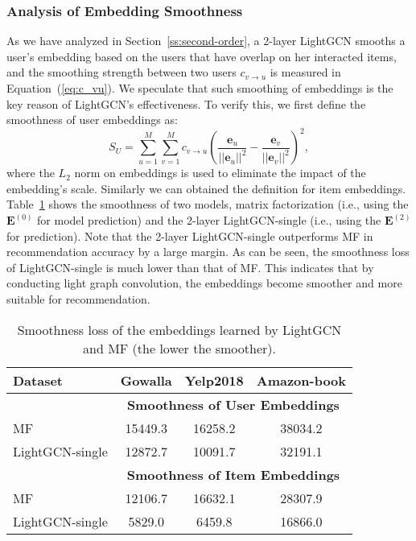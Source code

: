 \documentclass[sigconf]{acmart}
\theoremstyle{definition}
\begin{document}
\subsubsection{Analysis of Embedding Smoothness} 
As we have analyzed in Section~\ref{ss:second-order}, a 2-layer LightGCN smooths a user's embedding based on the users that have overlap on her interacted items, and the smoothing strength between two users $c_{v\to u}$ is measured in Equation~(\ref{eq:c_vu}). We speculate that such smoothing of embeddings is the key reason of LightGCN's effectiveness. To verify this, we first define the smoothness of user embeddings as:
\begin{equation}
    S_U = \sum_{u=1}^M \sum_{v=1}^M c_{v\to u} (\frac{\textbf{e}_{u}}{||\textbf{e}_{u}||^2} - \frac{\textbf{e}_{v}}{||\textbf{e}_{v}||^2})^2, 
\end{equation}
where the $L_2$ norm on embeddings is used to eliminate the impact of the embedding's scale. Similarly we can obtained the definition for item embeddings. 
Table~\ref{tab:Smoothness} shows the smoothness of two models, matrix factorization (i.e., using the $\textbf{E}^{(0)}$ for model prediction) and the 2-layer LightGCN-single (i.e., using the $\textbf{E}^{(2)}$ for prediction). 
Note that the 2-layer LightGCN-single outperforms MF in recommendation accuracy by a large margin. As can be seen, the smoothness loss of LightGCN-single is much lower than that of MF. This indicates that by conducting light graph convolution, the embeddings become smoother and more suitable for recommendation. 


\begin{table}[t]
\caption{Smoothness loss of the embeddings learned by LightGCN and MF (the lower the smoother).}\vspace{-8pt}
\label{tab:Smoothness}
\begin{tabular}{l|c|c|c}
\hline
\textbf{Dataset} & \multicolumn{1}{c|}{\textbf{Gowalla}} & \multicolumn{1}{c|}{\textbf{Yelp2018}} & \multicolumn{1}{c}{\textbf{Amazon-book}}\\ \hline
&\multicolumn{3}{c}{\textbf{Smoothness of User Embeddings}}\\ \hline
MF & 15449.3 & 16258.2 & 38034.2  \\ \hline
LightGCN-single & 12872.7 & 10091.7 & 32191.1 \\ \hline
&\multicolumn{3}{c}{\textbf{Smoothness of Item Embeddings}}\\ \hline
MF & 12106.7 & 16632.1 & 28307.9  \\ \hline
LightGCN-single & 5829.0 & 6459.8 & 16866.0 \\ \hline
\end{tabular}
\vspace{-5pt}
\end{table}
\end{document}
